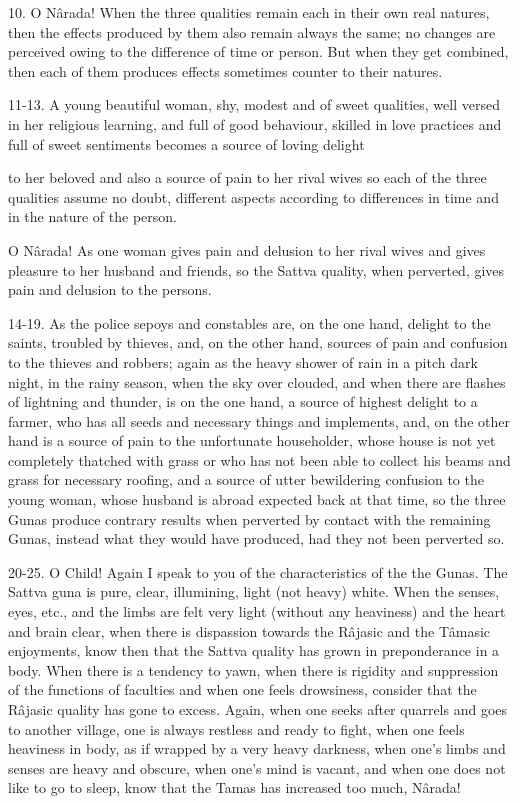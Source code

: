 10. O N\^arada! When the three qualities remain each in their own real natures, then the effects produced by them also remain always the same; no changes are perceived owing to the difference of time or person. But when they get combined, then each of them produces effects sometimes counter to their natures.

11-13. A young beautiful woman, shy, modest and of sweet qualities, well versed in her religious learning, and full of good behaviour, skilled in love practices and full of sweet sentiments becomes a source of loving delight

to her beloved and also a source of pain to her rival wives so each of the three qualities assume no doubt, different aspects according to differences in time and in the nature of the person.

O N\^arada! As one woman gives pain and delusion to her rival wives and gives pleasure to her husband and friends, so the Sattva quality, when perverted, gives pain and delusion to the persons.

14-19. As the police sepoys and constables are, on the one hand, delight to the saints, troubled by thieves, and, on the other hand, sources of pain and confusion to the thieves and robbers; again as the heavy shower of rain in a pitch dark night, in the rainy season, when the sky over clouded, and when there are flashes of lightning and thunder, is on the one hand, a source of highest delight to a farmer, who has all seeds and necessary things and implements, and, on the other hand is a source of pain to the unfortunate householder, whose house is not yet completely thatched with grass or who has not been able to collect his beams and grass for necessary roofing, and a source of utter bewildering confusion to the young woman, whose husband is abroad expected back at that time, so the three Gunas produce contrary results when perverted by contact with the remaining Gunas, instead what they would have produced, had they not been perverted so.

20-25. O Child! Again I speak to you of the characteristics of the the Gunas. The Sattva guna is pure, clear, illumining, light (not heavy) white. When the senses, eyes, etc., and the limbs are felt very light (without any heaviness) and the heart and brain clear, when there is dispassion towards the R\^ajasic and the T\^amasic enjoyments, know then that the Sattva quality has grown in preponderance in a body. When there is a tendency to yawn, when there is rigidity and suppression of the functions of faculties and when one feels drowsiness, consider that the R\^ajasic quality has gone to excess. Again, when one seeks after quarrels and goes to another village, one is always restless and ready to fight, when one feels heaviness in body, as if wrapped by a very heavy darkness, when one's limbs and senses are heavy and obscure, when one's mind is vacant, and when one does not like to go to sleep, know that the Tamas has increased too much, N\^arada!

